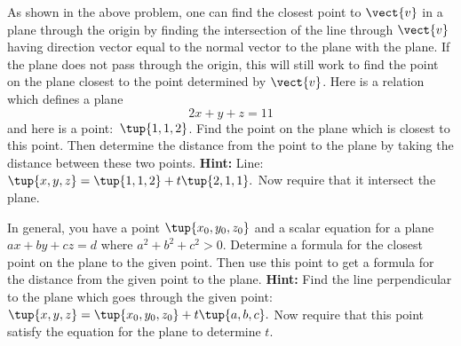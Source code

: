 \begin{enumialphparenastyle}
\begin{ex} As shown in the above problem, one can find the closest point to $\vect{v}$ in a plane through the origin by finding the intersection of the line
through $\vect{v}$ having direction vector equal to the normal vector to the
plane with the plane. If the plane does not pass through the origin, this
will still work to find the point on the plane closest to the point
determined by $\vect{v}$. Here is a relation which defines a plane 
\begin{equation*}
2x+y+z=11
\end{equation*}
and here is a point:\ $\tup{1,1,2} $. Find the point on the plane
which is closest to this point. Then determine the distance from the point
to the plane by taking the distance between these two points. \textbf{Hint: }
Line: $\tup{x,y,z} =\tup{1,1,2} +t\tup{2,1,1} .$ Now
require that it intersect the plane. $\ $
\end{ex}

\begin{ex} In general, you have a point $\tup{x_{0},y_{0},z_{0}} $ and a
scalar equation for a plane $ax+by+cz=d$ where $a^{2}+b^{2}+c^{2}>0$.
Determine a formula for the closest point on the plane to the given point.
Then use this point to get a formula for the distance from the given point
to the plane. \textbf{Hint: }Find the line perpendicular to the plane which
goes through the given point: $\tup{x,y,z} =\tup{
x_{0},y_{0},z_{0}} +t\tup{a,b,c} .$ Now require that this
point satisfy the equation for the plane to determine $t$.
\end{ex}

\end{enumialphparenastyle}